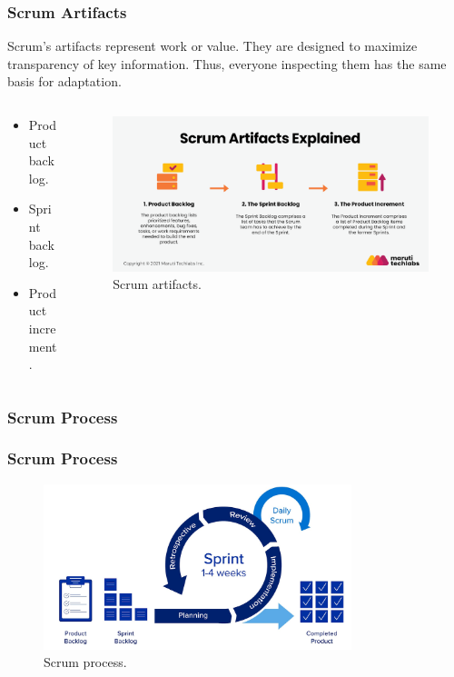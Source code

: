 \documentclass[
	11pt, %
]{beamer}
\begin{document}
\begin{frame}
	\frametitle{Scrum Artifacts}
	Scrum's artifacts represent work or value.
	They are designed to maximize transparency
	of key information. Thus, everyone
	inspecting them has the same basis for
	adaptation.

	\begin{columns}[c] %
		\begin{column}{0.4\textwidth} %
			\begin{itemize} %
				\item Product backlog.
				\item Sprint backlog.
				\item Product increment.
			\end{itemize}
		\end{column}
		\begin{column}{0.7\textwidth} %
			\begin{figure}
				\includegraphics[width=0.8\linewidth]{Scrum_artifact.png}
				\caption{Scrum artifacts.}
			\end{figure}
		\end{column}
	\end{columns}
\end{frame}

\subsubsection{Scrum Process}

\begin{frame}
	\frametitle{Scrum Process}
	\begin{figure}
		\centering
		\includegraphics[width=0.8\textwidth]{fonc_Scrum.jpg}
		\caption{Scrum process.}
	\end{figure}

\end{frame}
\end{document}
